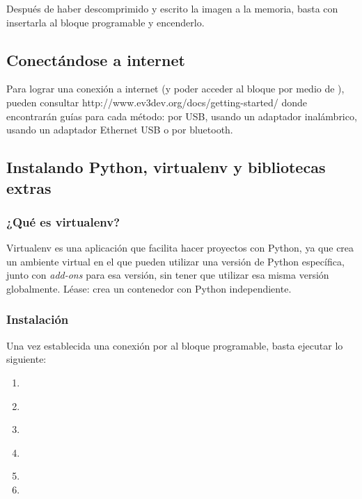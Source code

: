 Después de haber descomprimido y escrito la imagen a la memoria, basta con insertarla al bloque programable y encenderlo.


\subsection{Conectándose a internet}

Para lograr una conexión a internet (y poder acceder al bloque por medio de ), pueden consultar http://www.ev3dev.org/docs/getting-started/ donde encontrarán guías para cada método: por USB, usando un adaptador inalámbrico, usando un adaptador Ethernet USB o por bluetooth.


\subsection{Instalando Python, virtualenv y bibliotecas extras}

\subsubsection{¿Qué es virtualenv?}

Virtualenv es una aplicación que facilita hacer proyectos con Python, ya que crea un ambiente virtual en el que pueden utilizar una versión de Python específica, junto con \textit{add-ons} para esa versión, sin tener que utilizar esa misma versión globalmente. Léase: crea un contenedor con Python independiente.

\subsubsection{Instalación}
Una vez establecida una conexión por  al bloque programable, basta ejecutar lo siguiente:

\begin{enumerate}
  \item {}
  \item {}\\ 
  \item {}
  \item {}\\ 
  \item {}
  \item {}
\end{enumerate}

